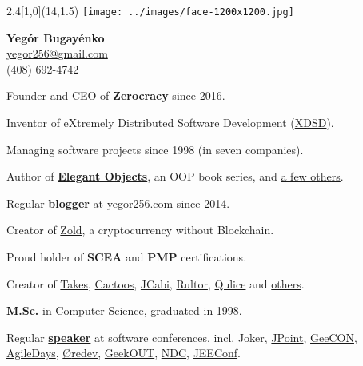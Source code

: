 \documentclass[12pt]{article}
\begin{document}
\setlength{\topskip}{0mm}
\setlength{\parindent}{0pt}
\setlength{\parskip}{6pt}
\raggedright
\large
{}

\begin{textblock}{2.4}[1,0](14,1.5){
  \texttt{[image: ../images/face-1200x1200.jpg]}
}\end{textblock}

\textbf{\Large Yeg\'or Bugay\'enko}\\%
\href{mailto:yegor256@gmail.com}{yegor256@gmail.com}\\%
(408) 692-4742

\vspace{1em}

Founder and CEO of \textbf{\href{https://www.zerocracy.com}{Zerocracy}} since 2016.

Inventor of eXtremely Distributed Software Development (\href{https://www.xdsd.org}{XDSD}).

Managing software projects since 1998 (in seven companies).

Author of \textbf{\href{https://www.yegor256.com/elegant-objects.html}{Elegant Objects}},
  an OOP book series, and \href{https://www.yegor256.com/books.html}{a few others}.

Regular \textbf{blogger} at \href{https://www.yegor256.com/}{yegor256.com} since 2014.

Creator of \href{https://www.zold.io}{Zold}, a cryptocurrency without Blockchain.

Proud holder of \textbf{SCEA} and
  \textbf{PMP} certifications.

Creator of \href{http://www.takes.org}{Takes},
  \href{http://www.cactoos.org}{Cactoos},
  \href{http://www.jcabi.com}{JCabi},
  \href{http://www.rultor.com}{Rultor},
  \href{http://www.qulice.com}{Qulice} and
  \href{https://www.yegor256.com/pets.html}{others}.

\textbf{M.Sc.} in Computer Science,
  \href{https://en.wikipedia.org/wiki/Oles_Honchar_Dnipro_National_University}{graduated} in 1998.

Regular \textbf{\href{https://www.yegor256.com/talks.html}{speaker}}
  at software conferences, incl.
  Joker,
  \href{https://www.youtube.com/watch?v=20QBvrHq6TA}{JPoint},
  \href{https://vimeo.com/177215750}{GeeCON},
  \href{https://www.youtube.com/watch?v=TLM9eN0b6zo}{AgileDays},
  \href{https://www.youtube.com/watch?v=03PXmPc7Q3g}{{\O}redev},
  \href{https://www.youtube.com/watch?v=7yTIWFZrXpg}{GeekOUT},
  \href{https://www.youtube.com/watch?v=vU_x6oK437I}{NDC},
  \href{https://www.youtube.com/watch?v=GS45LzE3LPQ}{JEEConf}.
\end{document}
